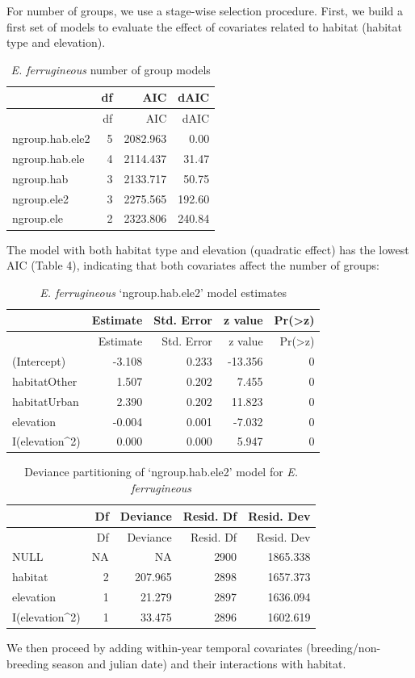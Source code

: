 \documentclass[]{article}
\begin{document}
For number of groups, we use a stage-wise selection procedure. First, we
build a first set of models to evaluate the effect of covariates related
to habitat (habitat type and elevation).

\begin{longtable}[]{@{}lrrr@{}}
\caption{\textit{E. ferrugineous} number of group models}\tabularnewline
\toprule
& df & AIC & dAIC\tabularnewline
\midrule
\endfirsthead
\toprule
& df & AIC & dAIC\tabularnewline
\midrule
\endhead
ngroup.hab.ele2 & 5 & 2082.963 & 0.00\tabularnewline
ngroup.hab.ele & 4 & 2114.437 & 31.47\tabularnewline
ngroup.hab & 3 & 2133.717 & 50.75\tabularnewline
ngroup.ele2 & 3 & 2275.565 & 192.60\tabularnewline
ngroup.ele & 2 & 2323.806 & 240.84\tabularnewline
\bottomrule
\end{longtable}

The model with both habitat type and elevation (quadratic effect) has
the lowest AIC (Table 4), indicating that both covariates affect the
number of groups:

\begin{longtable}[]{@{}lrrrr@{}}
\caption{\textit{E. ferrugineous} `ngroup.hab.ele2' model
estimates}\tabularnewline
\toprule
& Estimate & Std. Error & z value &
Pr(\textgreater{}\textbar{}z\textbar{})\tabularnewline
\midrule
\endfirsthead
\toprule
& Estimate & Std. Error & z value &
Pr(\textgreater{}\textbar{}z\textbar{})\tabularnewline
\midrule
\endhead
(Intercept) & -3.108 & 0.233 & -13.356 & 0\tabularnewline
habitatOther & 1.507 & 0.202 & 7.455 & 0\tabularnewline
habitatUrban & 2.390 & 0.202 & 11.823 & 0\tabularnewline
elevation & -0.004 & 0.001 & -7.032 & 0\tabularnewline
I(elevation\^{}2) & 0.000 & 0.000 & 5.947 & 0\tabularnewline
\bottomrule
\end{longtable}

\begin{longtable}[]{@{}lrrrr@{}}
\caption{Deviance partitioning of `ngroup.hab.ele2' model for
\textit{E. ferrugineous}}\tabularnewline
\toprule
& Df & Deviance & Resid. Df & Resid. Dev\tabularnewline
\midrule
\endfirsthead
\toprule
& Df & Deviance & Resid. Df & Resid. Dev\tabularnewline
\midrule
\endhead
NULL & NA & NA & 2900 & 1865.338\tabularnewline
habitat & 2 & 207.965 & 2898 & 1657.373\tabularnewline
elevation & 1 & 21.279 & 2897 & 1636.094\tabularnewline
I(elevation\^{}2) & 1 & 33.475 & 2896 & 1602.619\tabularnewline
\bottomrule
\end{longtable}

We then proceed by adding within-year temporal covariates
(breeding/non-breeding season and julian date) and their interactions
with habitat.
\end{document}
